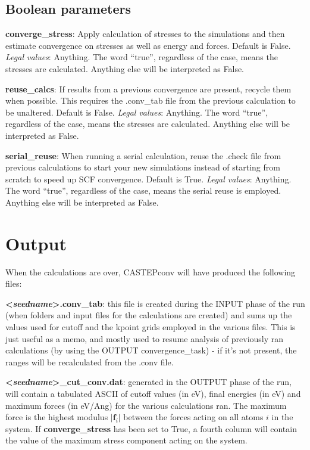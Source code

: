 \documentclass[10pt]{article}
\begin{document}
\subsection{Boolean parameters}

\textbf{converge\_stress}: Apply calculation of stresses to the simulations and 
then estimate convergence on stresses as well as energy and forces. Default is 
False.\newline
\textit{Legal values}: Anything. The word ``true'', regardless of the case, 
means the stresses are calculated. Anything else will be interpreted as 
False.\newline

\textbf{reuse\_calcs}: If results from a previous convergence are present, 
recycle them when possible. This requires the .conv\_tab file from the previous 
calculation to be unaltered. Default is False.\newline
\textit{Legal values}: Anything. The word ``true'', regardless of the case, 
means the stresses are calculated. Anything else will be interpreted as 
False.\newline

\textbf{serial\_reuse}: When running a serial calculation, reuse the .check file from previous calculations to start your new simulations instead of starting from scratch to speed up SCF convergence. Default is True.\newline
\textit{Legal values}: Anything. The word ``true'', regardless of the case, 
means the serial reuse is employed. Anything else will be interpreted as 
False.\newline

\section{Output}

When the calculations are over, CASTEPconv will have produced the following 
files:

\textbf{\textless \textit{seedname}\textgreater.conv\_tab}: this file is created 
during the INPUT phase of the run (when folders and input files for the 
calculations are created) and sums up the values used for cutoff and the kpoint 
grids employed in the various files. This is just useful as a memo, and mostly 
used to resume analysis of previously ran calculations (by using the OUTPUT 
convergence\_task) - if it's not present, the ranges will be recalculated from 
the .conv file.

\textbf{\textless \textit{seedname}\textgreater\_cut\_conv.dat}: generated in 
the OUTPUT phase of the run, will contain a tabulated ASCII of cutoff values (in 
eV), final energies (in eV) and maximum forces (in eV/Ang) for the various 
calculations ran. The maximum force is the highest modulus $|\mathbf{f}_i|$ 
between the forces acting on all atoms $i$ in the system. If 
\textbf{converge\_stress} has been set to True, a fourth column will contain the 
value of the maximum stress component acting on the system.
\end{document}
